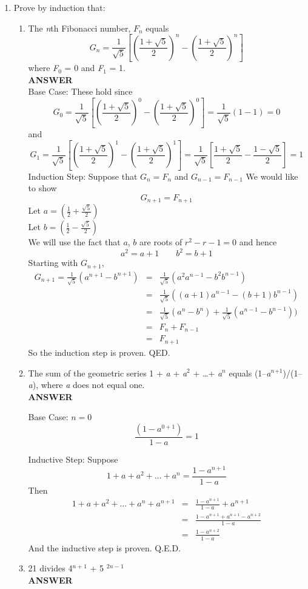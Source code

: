 \documentclass{article}
\newcommand{\fr}[2]{\frac{#1}{#2}}
\begin{document}
\begin{enumerate}
\item
Prove by induction that:


\begin{enumerate}
\item
The \textit{n}th Fibonacci number, $F_n$  equals
\[
G_n = \fr{1}{\sqrt{5}}\left[(\fr{1 +\sqrt{5}}{2})^{n} - (\fr{1 +
\sqrt{5} }{2})^n
 \right] \]
 where \textit{F}$_{\mathit{0}}$ = 0
and \textit{F}$_{\mathit{1}}$ = 1.
\\ \textbf{ANSWER}
\\
    Base Case:
These hold since
\[
G_0 = \fr{1}{\sqrt{5}}\left[(\fr{1 +\sqrt{5}}{2})^{0} - (\fr{1 +
\sqrt{5} }{2})^0 \right] = \fr{1}{\sqrt{5}}(1-1) = 0
\]
and
\[
G_1 = \fr{1}{\sqrt{5}}\left[(\fr{1 +\sqrt{5}}{2})^{1} - (\fr{1 +
\sqrt{5} }{2})^1 \right] = \fr{1}{\sqrt{5}} \left[
\fr{1+\sqrt{5}}{2} - \fr{1- \sqrt{5}}{2} \right] = 1
\]
Induction Step: Suppose that $G_n = F_n$ and $G_{n-1} = F_{n-1}$
We would like to show
$$ G_{n+1} = F_{n+1}$$
    Let $a = (\fr{1}{2} + \fr{\sqrt{5}}{2})$\\
    Let $b = (\fr{1}{2} - \fr{\sqrt{5}}{2})$\\
We will use the fact that $a$, $b$ are roots of  $r^2 - r - 1 = 0$
and hence
\[
a^2 = a + 1 \qquad b^2 = b + 1
\]
Starting with $G_{n+1}$,
\begin{eqnarray*}
G_{n+1} = \fr{1}{\sqrt{5}}(a^{n+1} - b^{n+1}) & = &
\fr{1}{\sqrt{5}} ( a^2 a^{n-1} - b^2 b^{n-1} ) \\
& = & \fr{1}{\sqrt{5}} ( (a+1) a^{n-1} - (b+1) b^{n-1} ) \\
& = & \fr{1}{\sqrt{5}}(a^n - b^n) + \fr{1}{\sqrt{5}}
                (a^{n-1} - b^{n-1})) \\
& = & F_n + F_{n-1}\\
& = & F_{n+1}
\end{eqnarray*}
So the induction step is proven. QED.

\item
The sum of the geometric series 1 + \textit{a} + \textit{a}$^{2}$
+ \dots  + \textit{a}$^{n}$ equals
(1--\textit{a}$^{\mathit{n}}$$^{+1}$)/(1--\textit{a}), where
\textit{a} does not equal
one.\\
\vskip 10pt  \textbf{ANSWER}

    Base Case: $n = 0 $\\
    $$ \fr{(1 - a^{0+1})}{1 - a} = 1 $$

    Inductive Step:
    Suppose
    \[
     1 + a + a^2 + \ldots + a^n =
    \fr{1-a^{n+1}}{1-a}
    \]
    Then
    \begin{eqnarray*}
    1 + a + a^2 + \ldots + a^n + a^{n+1} & = &
    \fr{1-a^{n+1}}{1-a} +  a^{n+1}\\
    & = & \fr{1 - a^{n+1} + a^{n+1} - a^{n+2}}{1 - a} \\
    & = & \fr{1- a^{n+2}}{1 -a}
    \end{eqnarray*}
    And the inductive step is proven. Q.E.D.
\item
21 divides 4$^{\mathit{n+}}$$^{1}$ + 5 $^{\mathit{2n-}}$$^{1}$\\
\vskip 10pt  \textbf{ANSWER}


\end{enumerate}
\end{enumerate}
\end{document}
